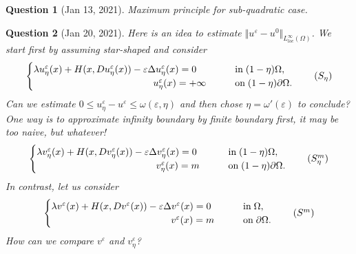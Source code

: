 \documentclass[11pt,reqno]{amsart}
\numberwithin{figure}{section}
\theoremstyle{plain}
\newtheorem{quest}{Question}
\theoremstyle{remark}
\numberwithin{equation}{section}
\begin{document}
\begin{quest} [Jan 13, 2021] Maximum principle for sub-quadratic case.
\end{quest}

\begin{quest}[Jan 20, 2021] Here is an idea to estimate $\Vert u^\varepsilon - u^0\Vert_{L^\infty_{loc}(\Omega)}$. We start first by assuming star-shaped and consider
\begin{equation}\label{e:S_eta}
    \begin{cases}
    \lambda u_\eta^\varepsilon(x) + H(x,Du_\eta^\varepsilon(x)) - \varepsilon \Delta u_\eta^\varepsilon(x) = 0 &\qquad
    \text{in}\;(1-\eta)\Omega, \vspace{0cm}\\
    \qquad\qquad\qquad\qquad\qquad\qquad\;\, u^\varepsilon_\eta(x) = +\infty &\qquad
    \text{on}\;(1-\eta)\partial\Omega.
    \end{cases} \tag{$S_\eta$}
\end{equation}
Can we estimate $0\leq u^\varepsilon_\eta - u^\varepsilon \leq \omega(\varepsilon,\eta)$ and then chose $\eta = \omega'(\varepsilon)$ to conclude? One way is to approximate infinity boundary by finite boundary first, it may be too naive, but whatever! 
\begin{equation}\label{e:S_eta_m}
    \begin{cases}
    \lambda v_\eta^\varepsilon(x) + H(x,Dv_\eta^\varepsilon(x)) - \varepsilon \Delta v_\eta^\varepsilon(x) = 0 &\qquad
    \text{in}\;(1-\eta)\Omega, \vspace{0cm}\\
    \qquad\qquad\qquad\qquad\qquad\qquad\;\, v^\varepsilon_\eta(x) = m &\qquad
    \text{on}\;(1-\eta)\partial\Omega.
    \end{cases} \tag{$S_{\eta}^m$}
\end{equation}
In contrast, let us consider
\begin{equation}\label{e:S_0}
    \begin{cases}
    \lambda v^\varepsilon(x) + H(x,Dv^\varepsilon(x)) - \varepsilon \Delta v^\varepsilon(x) = 0 &\qquad
    \text{in}\;\Omega, \vspace{0cm}\\
    \qquad\qquad\qquad\qquad\qquad\qquad\;\, v^\varepsilon(x) = m &\qquad
    \text{on}\;\partial\Omega.
    \end{cases} \tag{$S^m$}
\end{equation}
How can we compare $v^\varepsilon$ and $v^\varepsilon_\eta$?
\end{quest}
\end{document}

